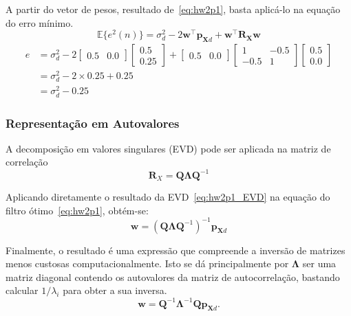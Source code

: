 A partir do vetor de pesos, resultado de~\ref{eq:hw2p1}, basta aplicá-lo na equação do erro mínimo.
\begin{equation}
    \mathbb{E}\{e^{2}(n)\}  =\sigma^{2}_{d} - 2\mathbf{w}^{\top}\mathbf{p}_{\mathbf{X} d} + \mathbf{w}^{\top} \mathbf{R_{X}} \mathbf{w}      
\end{equation}
\begin{align*}
     e &= \sigma^{2}_{d} - 2 \left[ \begin{matrix} 0.5 & 0.0 \end{matrix} \right] \left[ \begin{matrix} 0.5 \\ 0.25 \end{matrix} \right] + \left[ \begin{matrix} 0.5 & 0.0 \end{matrix} \right] \left[ \begin{matrix} 1 & -0.5 \\ -0.5 & 1 \end{matrix} \right]  \left[ \begin{matrix} 0.5  \\ 0.0 \end{matrix} \right] \\
     &= \sigma^{2}_{d} - 2 \times 0.25 + 0.25 \\
     &= \sigma^{2}_{d} - 0.25
\end{align*}


\subsubsection*{Representação em Autovalores}
A decomposição em valores singulares (EVD) pode ser aplicada na matriz de correlação
\begin{equation}
    \mathbf{R}_{X} = \mathbf{Q} \mathbf{\Lambda} \mathbf{Q}^{-1} \label{eq:hw2p1_EVD}
\end{equation}


Aplicando diretamente o resultado da EVD~\ref{eq:hw2p1_EVD} na equação do filtro ótimo~\ref{eq:hw2p1}, obtém-se:
\begin{equation}
    \mathbf{w}= (\mathbf{Q} \mathbf{\Lambda} \mathbf{Q}^{-1})^{-1} \mathbf{p}_{\mathbf{X} d}
\end{equation}

Finalmente, o resultado é uma expressão que compreende a inversão de matrizes menos custosas computacionalmente. Isto se dá principalmente por $\mathbf{\Lambda}$ ser uma matriz diagonal contendo os autovalores da matriz de autocorrelação, bastando calcular $1/\lambda_{i}$ para obter a sua inversa.
\begin{equation}
    \mathbf{w} = \mathbf{Q}^{-1} \mathbf{\Lambda}^{-1} \mathbf{Q} \mathbf{p}_{\mathbf{X} d}.
\end{equation}
                                         

